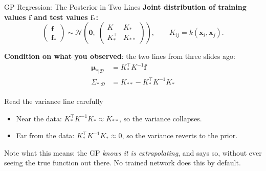 \documentclass[aspectratio=169,11pt]{beamer}
\newcommand{\emphc}[1]{\textcolor{harvardcrimson}{#1}}
\newcommand{\x}{\bm{x}}
\begin{document}
\begin{frame}{GP Regression: The Posterior in Two Lines}
\textbf{Joint distribution of training values $\bm f$ and test values $\bm f_*$:}
\[
\begin{pmatrix} \bm f \\ \bm f_* \end{pmatrix} \sim
\mathcal{N}\!\left(\bm 0,\;
\begin{pmatrix} K & K_* \\ K_*^\top & K_{**} \end{pmatrix}\right),
\qquad K_{ij} = k(\x_i, \x_j).
\]

\textbf{Condition on what you observed}: the two lines from three slides ago:
\begin{align*}
\bm\mu_{*|\mathcal{D}} &= K_*^\top K^{-1} \bm f\\
\Sigma_{*|\mathcal{D}} &= K_{**} - K_*^\top K^{-1} K_*
\end{align*}

\vspace{0.15cm}
\begin{alertblock}{Read the variance line carefully}
\begin{itemize}\itemsep1pt
  \item Near the data: $K_*^\top K^{-1} K_* \approx K_{**}$, so the variance \emphc{collapses}.
  \item Far from the data: $K_*^\top K^{-1} K_* \approx 0$, so the variance \emphc{reverts to the prior}.
\end{itemize}
\vspace{2pt}
Note what this means: the GP \emph{knows it is extrapolating}, and says so, without ever seeing the true function out there. No trained network does this by default.
\end{alertblock}
\end{frame}
\end{document}
